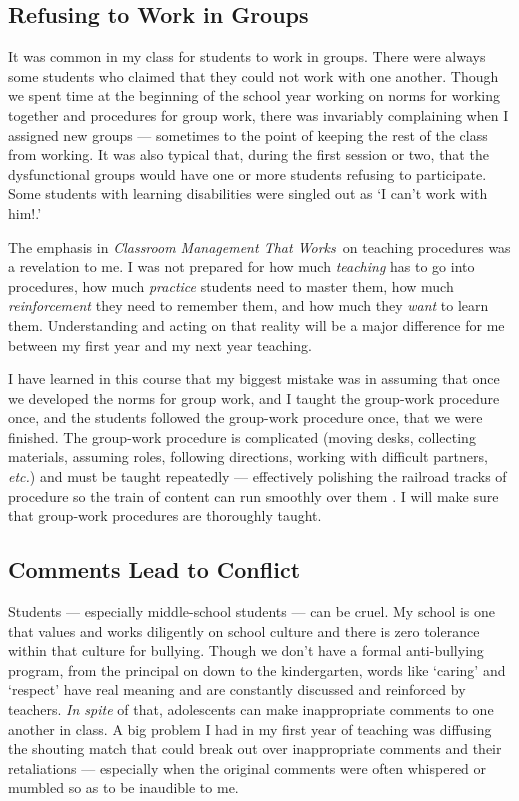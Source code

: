\documentclass[11pt,twocolumn]{article}%
\def\foreign{\em}
\def\etc{{\foreign etc.}}
\def\cmtw{{\em Classroom Management That Works}}
\begin{document}
\subsection{Refusing to Work in Groups}
\label{Refusing to Work in Groups}

It was common in my class for students to work in groups. There were
always some students who claimed that they could not work with one
another. Though we spent time at the beginning of the school year
working on norms for working together and procedures for group work,
there was invariably complaining when I assigned new groups ---
sometimes to the point of keeping the rest of the class from
working. It was also typical that, during the first session or two,
that the dysfunctional groups would have one or more students
refusing to participate. Some students with learning disabilities
were singled out as `I can't work with him!.'

The emphasis in \cmtw\ on teaching procedures was a revelation to
me. I was not prepared for how much {\em teaching} has to go into
procedures, how much {\em practice} students need to master them,
how much {\em reinforcement} they need to remember them, and how
much they {\em want} to learn them. Understanding and acting on that
reality will be a major difference for me between my first year and
my next year teaching.

I have learned in this course that my biggest mistake was in
assuming that once we developed the norms for group work, and I
taught the group-work procedure once, and the students followed the
group-work procedure once, that we were finished. The group-work
procedure is complicated (moving desks, collecting materials,
assuming roles, following directions, working with difficult
partners, \etc) and must be taught repeatedly --- effectively
polishing the railroad tracks of procedure so the train of content
can run smoothly over them \cite[p. 80]{book:ccm}. I will make sure that
group-work procedures are thoroughly taught.

\subsection{Comments Lead to Conflict}
\label{Comments Lead to Conflict}

Students --- especially middle-school students --- can be cruel. My
school is one that values and works diligently on school culture and
there is zero tolerance within that culture for bullying. Though we
don't have a formal anti-bullying program, from the principal on
down to the kindergarten, words like `caring' and `respect' have
real meaning and are constantly discussed and reinforced by
teachers. {\em In spite} of that, adolescents can make inappropriate
comments to one another in class. A big problem I had in my first
year of teaching was diffusing the shouting match that could break
out over inappropriate comments and their retaliations ---
especially when the original comments were often whispered or
mumbled so as to be inaudible to me.
\end{document}
